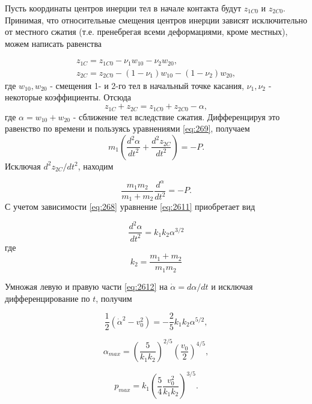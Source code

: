 \documentclass[specialist, subf, href, colorlinks=true, 14pt, final]{disser}
\theoremstyle{definition}
\begin{document}
Пусть координаты центров инерции тел в начале контакта 
будут $z_{1C0}$ и $z_{2C0}$. Принимая, что относительные смещения центров инерции зависят исключительно от местного сжатия (т.е. пренебрегая всеми деформациями, кроме местных), можем написать равенства
\addtocounter{equation}{1}
\begin{equation}\label{eq:2610}
   \begin{array}{l}
    z_{1C} = z_{1C0} - \nu_1 w_{10} - \nu_2 w_{20}, \\
    z_{2C} = z_{2C0} - (1 - \nu_1) w_{10} - (1 - \nu_2) w_{20},
   \end{array}
   \tag{10}
\end{equation}
где $w_{10}, w_{20}$ - смещения 1- и 2-го тел в начальный точке касания, $\nu_1, \nu_2$ - некоторые коэффициенты. Отсюда 
\[ z_{1C} + z_{2C} = z_{1C0} + z_{2C0} - \alpha, \]
где $\alpha = w_{10} + w_{20}$ - сближение тел вследствие сжатия. Дифференцируя это равенство по времени и пользуясь уравнениями \eqref{eq:269}, получаем
 \[ m_1 \left( \frac{d^2 \alpha}{dt^2} + \frac{d^2 z_{2C}}{dt^2} \right) = - P. \] 
Исключая $d^2z_{2C}/dt^2 $, находим
\addtocounter{equation}{1}
\begin{equation}\label{eq:2611}
   \frac{m_1 m_2}{m_1+m_2} \frac{d^\alpha}{dt^2} = -P.
    \tag{11}
\end{equation}
С учетом зависимости \eqref{eq:268} уравнение \eqref{eq:2611} приобретает вид
\addtocounter{equation}{1}
\begin{equation}\label{eq:2612}
   \frac{d^2 \alpha}{dt^2} = k_1 k_2 \alpha^{3/2}
    \tag{12}
\end{equation}
где
\[ k_2 = \frac{m_1 + m_2}{m_1 m_2} \]

Умножая левую и правую части \eqref{eq:2612} на $ \dot{\alpha} = d \alpha/ dt $ и исключая дифференцирование по $t$, получим
\addtocounter{equation}{1}
\begin{equation}\label{eq:2613}
   \frac{1}{2}( \dot{\alpha}^2 - v^2_0 ) = - \frac{2}{5} k_1 k_2 \alpha^{5/2},
    \tag{13}
\end{equation}
\addtocounter{equation}{1}
\begin{equation}\label{eq:2614}
   \alpha_{max} = \left( \frac{5}{k_1 k_2} \right)^{2/5} \left( \frac{v_0}{2} \right)^{4/5},
    \tag{14}
\end{equation}
\addtocounter{equation}{1}
\begin{equation}\label{eq:2615}
   p_{max} = k_1 \left( \frac{5}{4} \frac{v_0^2}{k_1 k_2} \right)^{3/5}.
    \tag{15}
\end{equation}
\\
\end{document}
